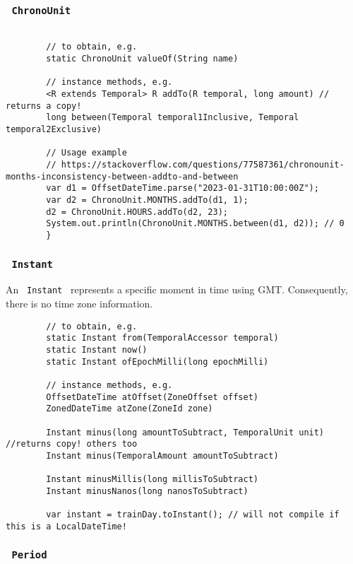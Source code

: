\documentclass{scrartcl}
\begin{document}
\subsubsection{\lstinline$ ChronoUnit $}

    \begin{lstlisting}

        // to obtain, e.g.
        static ChronoUnit valueOf(String name)

        // instance methods, e.g.
        <R extends Temporal> R addTo(R temporal, long amount) // returns a copy!
        long between(Temporal temporal1Inclusive, Temporal temporal2Exclusive)

        // Usage example
        // https://stackoverflow.com/questions/77587361/chronounit-months-inconsistency-between-addto-and-between
        var d1 = OffsetDateTime.parse("2023-01-31T10:00:00Z");
        var d2 = ChronoUnit.MONTHS.addTo(d1, 1);
        d2 = ChronoUnit.HOURS.addTo(d2, 23);
        System.out.println(ChronoUnit.MONTHS.between(d1, d2)); // 0
        }
\end{lstlisting}

\subsubsection{\lstinline$ Instant $}

     An \lstinline$ Instant $ represents a specific moment in time using GMT.
    Consequently, there is no time zone information.

    \begin{lstlisting}
        // to obtain, e.g.
        static Instant from(TemporalAccessor temporal)
        static Instant now()
        static Instant ofEpochMilli(long epochMilli)

        // instance methods, e.g.
        OffsetDateTime atOffset(ZoneOffset offset)
        ZonedDateTime atZone(ZoneId zone)

        Instant minus(long amountToSubtract, TemporalUnit unit) //returns copy! others too
        Instant minus(TemporalAmount amountToSubtract)

        Instant minusMillis(long millisToSubtract)
        Instant minusNanos(long nanosToSubtract)

        var instant = trainDay.toInstant(); // will not compile if this is a LocalDateTime!

    \end{lstlisting}

\subsubsection{\lstinline$ Period $}
\end{document}
